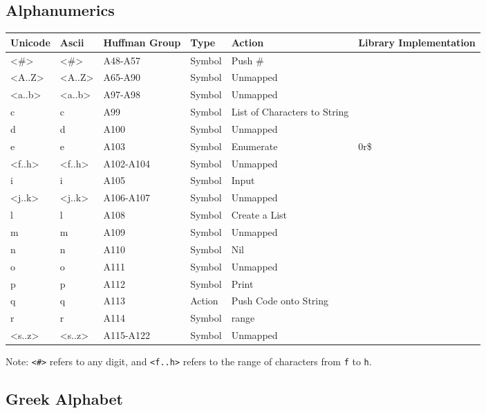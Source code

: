 \documentclass{article}
\begin{document}
\subsection{Alphanumerics}

\begin{tabular}{| >{\ttfamily}l| >{\ttfamily}l| >{\ttfamily}l|l|l| >{\ttfamily}l|}
    \hline
    \textbf{Unicode} & \textbf{Ascii} & \textbf{Huffman Group}& \textbf{Type} & \textbf{Action} & \textbf{Library Implementation}\\
    \hline
    <\#> & <\#> & A48-A57 & Symbol & Push \# & \\
    <A..Z> & <A..Z> & A65-A90 & Symbol & Unmapped & \\
    <a..b> & <a..b> & A97-A98 & Symbol & Unmapped & \\
    c & c & A99 & Symbol & List of Characters to String & \\
    d & d & A100 & Symbol & Unmapped & \\
    e & e & A103 & Symbol & Enumerate & 0r\$\\
    <f..h> & <f..h> & A102-A104 & Symbol & Unmapped & \\
    i & i & A105 & Symbol & Input & \\
    <j..k> & <j..k> & A106-A107 & Symbol & Unmapped & \\
    l & l & A108 & Symbol & Create a List & \\
    m & m & A109 & Symbol & Unmapped & \\
    n & n & A110 & Symbol & Nil & \\
    o & o & A111 & Symbol & Unmapped & \\
    p & p & A112 & Symbol & Print & \\
    q & q & A113 & Action & Push Code onto String & \\
    r & r & A114 & Symbol & range & \\
    <s..z> & <s..z> & A115-A122 & Symbol & Unmapped & \\
    \hline
\end{tabular}

Note: \texttt{<\#>} refers to any digit, and \texttt{<f..h>} refers to the range of characters from
    \texttt f to \texttt h.

\subsection{Greek Alphabet}
\end{document}

